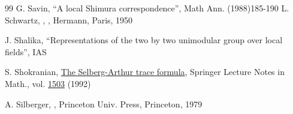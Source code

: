 \documentclass[12pt,letterpaper]{book}
\theoremstyle{plain}
\theoremstyle{definition}
\theoremstyle{remark}
\theoremstyle{remark}
\begin{document}
\begin{thebibliography}{99}
 G. Savin, ``A local Shimura correspondence'',
Math Ann. (1988)185-190
 L. Schwartz,  
, , Hermann, Paris, 1950




 J. Shalika, ``Representations of the two by two
unimodular group over local fields'', IAS



 S. Shokranian, \underline{The Selberg-Arthur trace formula},
Springer Lecture Notes in Math., vol. \underline{1503} (1992)

 A. Silberger,  
   
 , Princeton Univ. Press, Princeton, 1979







\end{thebibliography}
\end{document}
